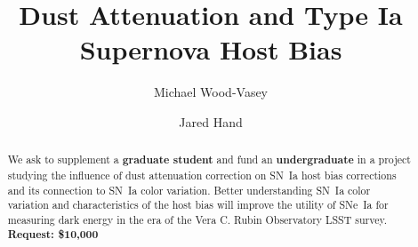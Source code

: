\documentclass[modern]{aastex63}
\begin{document}
\title{Dust Attenuation and Type Ia Supernova Host Bias}


\author{Michael Wood-Vasey}

\author{Jared Hand}

\begin{abstract}
    We ask to supplement a {\bf graduate student} and fund an {\bf undergraduate} in a project studying the influence of dust attenuation correction on SN~Ia host bias corrections and its connection to SN~Ia color variation.
    Better understanding SN~Ia color variation and characteristics of the host bias will improve the utility of SNe~Ia for measuring dark energy in the era of the Vera C. Rubin Observatory LSST survey.\\
    {\bf Request: \$10,000}
\end{abstract}
\end{document}
